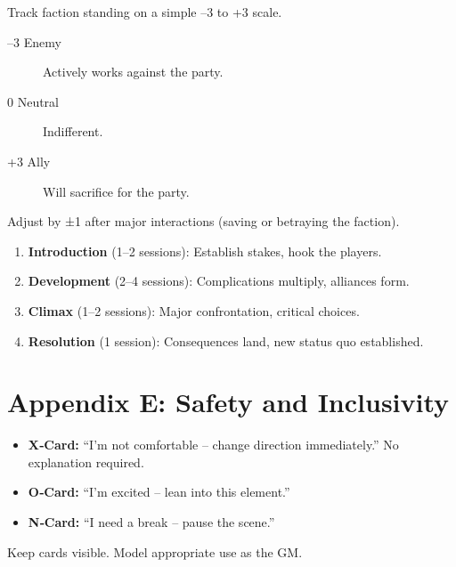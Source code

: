 \begin{tcolorbox}[title=Faction Loyalty Scale (Optional), colback=white!97!gray, colframe=black!80!gray]
Track faction standing on a simple –3 to +3 scale.
\begin{description}
  \item[–3 Enemy] Actively works against the party.
  \item[0 Neutral] Indifferent.
  \item[+3 Ally] Will sacrifice for the party.
\end{description}
Adjust by ±1 after major interactions (saving or betraying the faction).
\end{tcolorbox}

\begin{tcolorbox}[title=Campaign Pacing (Arc Structure), colback=white!97!gray, colframe=black!80!gray]
\begin{enumerate}
  \item \textbf{Introduction} (1–2 sessions): Establish stakes, hook the players.
  \item \textbf{Development} (2–4 sessions): Complications multiply, alliances form.
  \item \textbf{Climax} (1–2 sessions): Major confrontation, critical choices.
  \item \textbf{Resolution} (1 session): Consequences land, new status quo established.
\end{enumerate}
\end{tcolorbox}

\clearpage
\section*{Appendix E: Safety and Inclusivity}
\label{app:safety}

\begin{tcolorbox}[title=X‑Card System, colback=white!97!gray, colframe=black!80!gray]
\begin{itemize}
  \item \textbf{X‑Card:} “I’m not comfortable – change direction immediately.” No explanation required.
  \item \textbf{O‑Card:} “I’m excited – lean into this element.”
  \item \textbf{N‑Card:} “I need a break – pause the scene.”
\end{itemize}
Keep cards visible. Model appropriate use as the GM.
\end{tcolorbox}

